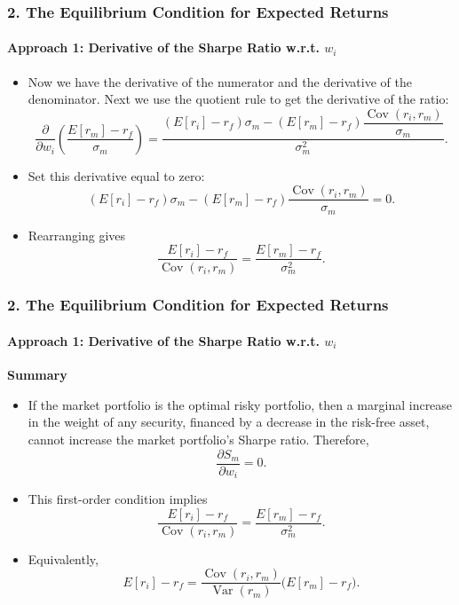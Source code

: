 \documentclass{beamer}
\begin{document}
\begin{frame}[t]
\frametitle{2. The Equilibrium Condition for Expected Returns}
\framesubtitle{Approach 1: Derivative of the Sharpe Ratio w.r.t. $w_i$}

\begin{itemize}
    \item Now we have the derivative of the numerator and the derivative of the denominator.   Next we use the quotient rule to get the derivative of the ratio:
    \[
    \frac{\partial}{\partial w_i}
    \left(
        \frac{E[r_m]-r_f}{\sigma_m}
    \right)
    =
    \frac{
        (E[r_i]-r_f)\sigma_m
        -
        (E[r_m]-r_f)
        \dfrac{\operatorname{Cov}(r_i,r_m)}{\sigma_m}
    }{\sigma_m^2}.
    \]

    \item Set this derivative equal to zero:
    \[
    (E[r_i]-r_f)\sigma_m
    -
    (E[r_m]-r_f)
    \frac{\operatorname{Cov}(r_i,r_m)}{\sigma_m}
    =0.
    \]

    \item Rearranging gives
    \[
    \frac{E[r_i]-r_f}
         {\operatorname{Cov}(r_i,r_m)}
    =
    \frac{E[r_m]-r_f}{\sigma_m^2}.
    \]
\end{itemize}

\end{frame}

\begin{frame}[t]
\frametitle{2. The Equilibrium Condition for Expected Returns}
\framesubtitle{Approach 1: Derivative of the Sharpe Ratio w.r.t. $w_i$}

\textbf{Summary}

\begin{itemize}
    \item If the market portfolio is the optimal risky portfolio, then
    a marginal increase in the weight of any security, financed by a
    decrease in the risk-free asset, cannot increase the market
    portfolio's Sharpe ratio. Therefore,
    \[
    \frac{\partial S_m}{\partial w_i}=0.
    \]

    \item This first-order condition implies
    \[
    \frac{E[r_i]-r_f}
         {\operatorname{Cov}(r_i,r_m)}
    =
    \frac{E[r_m]-r_f}
         {\sigma_m^2}.
    \]

    \item Equivalently,
    \[
    E[r_i]-r_f
    =
    \frac{\operatorname{Cov}(r_i,r_m)}
         {\operatorname{Var}(r_m)}
    \bigl(E[r_m]-r_f\bigr).
    \]
\end{itemize}
    

\end{frame}
\end{document}

